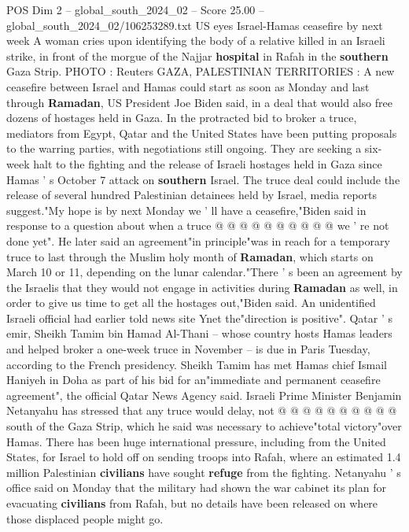 \begin{textsample}{POS Dim 2 – global\_south\_2024\_02 – Score 25.00 – global\_south\_2024\_02/106253289.txt}  \label{ex:f2_pos_037}
US eyes Israel-Hamas ceasefire by next week A woman cries upon identifying the body of a relative killed in an Israeli strike, in front of the morgue of the Najjar \textbf{hospital} in Rafah in the \textbf{southern} Gaza Strip.
PHOTO : Reuters GAZA, PALESTINIAN TERRITORIES : A new ceasefire between Israel and Hamas could start as soon as Monday and last through \textbf{Ramadan}, US President Joe Biden said, in a deal that would also free dozens of hostages held in Gaza.
In the protracted bid to broker a truce, mediators from Egypt, Qatar and the United States have been putting proposals to the warring parties, with negotiations still ongoing.
They are seeking a six-week halt to the fighting and the release of Israeli hostages held in Gaza since Hamas ' s October 7 attack on \textbf{southern} Israel.
The truce deal could include the release of several hundred Palestinian detainees held by Israel, media reports suggest."My hope is by next Monday we ' ll have a ceasefire,"Biden said in response to a question about when a truce @ @ @ @ @ @ @ @ @ @ we ' re not done yet".
He later said an agreement"in principle"was in reach for a temporary truce to last through the Muslim holy month of \textbf{Ramadan}, which starts on March 10 or 11, depending on the lunar calendar."There ' s been an agreement by the Israelis that they would not engage in activities during \textbf{Ramadan} as well, in order to give us time to get all the hostages out,"Biden said.
An unidentified Israeli official had earlier told news site Ynet the"direction is positive".
Qatar ' s emir, Sheikh Tamim bin Hamad Al-Thani -- whose country hosts Hamas leaders and helped broker a one-week truce in November -- is due in Paris Tuesday, according to the French presidency.
Sheikh Tamim has met Hamas chief Ismail Haniyeh in Doha as part of his bid for an"immediate and permanent ceasefire agreement", the official Qatar News Agency said.
Israeli Prime Minister Benjamin Netanyahu has stressed that any truce would delay, not @ @ @ @ @ @ @ @ @ @ south of the Gaza Strip, which he said was necessary to achieve"total victory"over Hamas.
There has been huge international pressure, including from the United States, for Israel to hold off on sending troops into Rafah, where an estimated 1.4 million Palestinian \textbf{civilians} have sought \textbf{refuge} from the fighting.
Netanyahu ' s office said on Monday that the military had shown the war cabinet its plan for evacuating \textbf{civilians} from Rafah, but no details have been released on where those displaced people might go.

\end{textsample}
